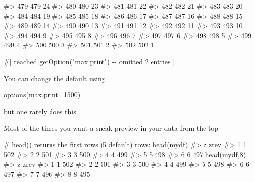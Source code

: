 \documentclass[
  letterpaper,
  DIV=11,
  numbers=noendperiod]{scrreprt}
\newenvironment{Shaded}{\begin{snugshade}}{\end{snugshade}}
\newcommand{\AttributeTok}[1]{\textcolor[rgb]{0.40,0.45,0.13}{#1}}
\newcommand{\CommentTok}[1]{\textcolor[rgb]{0.37,0.37,0.37}{#1}}
\newcommand{\DecValTok}[1]{\textcolor[rgb]{0.68,0.00,0.00}{#1}}
\newcommand{\FunctionTok}[1]{\textcolor[rgb]{0.28,0.35,0.67}{#1}}
\newcommand{\NormalTok}[1]{\textcolor[rgb]{0.00,0.23,0.31}{#1}}
\begin{document}
\begin{Shaded}
\begin{Highlighting}[]
\CommentTok{\#\textgreater{} 479 479   24}
\CommentTok{\#\textgreater{} 480 480   23}
\CommentTok{\#\textgreater{} 481 481   22}
\CommentTok{\#\textgreater{} 482 482   21}
\CommentTok{\#\textgreater{} 483 483   20}
\CommentTok{\#\textgreater{} 484 484   19}
\CommentTok{\#\textgreater{} 485 485   18}
\CommentTok{\#\textgreater{} 486 486   17}
\CommentTok{\#\textgreater{} 487 487   16}
\CommentTok{\#\textgreater{} 488 488   15}
\CommentTok{\#\textgreater{} 489 489   14}
\CommentTok{\#\textgreater{} 490 490   13}
\CommentTok{\#\textgreater{} 491 491   12}
\CommentTok{\#\textgreater{} 492 492   11}
\CommentTok{\#\textgreater{} 493 493   10}
\CommentTok{\#\textgreater{} 494 494    9}
\CommentTok{\#\textgreater{} 495 495    8}
\CommentTok{\#\textgreater{} 496 496    7}
\CommentTok{\#\textgreater{} 497 497    6}
\CommentTok{\#\textgreater{} 498 498    5}
\CommentTok{\#\textgreater{} 499 499    4}
\CommentTok{\#\textgreater{} 500 500    3}
\CommentTok{\#\textgreater{} 501 501    2}
\CommentTok{\#\textgreater{} 502 502    1}
\end{Highlighting}
\end{Shaded}

\begin{Shaded}
\begin{Highlighting}[]
\CommentTok{\#[ reached getOption("max.print") {-}{-} omitted 2 entries ]}
\end{Highlighting}
\end{Shaded}

You can change the default using

\begin{Shaded}
\begin{Highlighting}[]
 \FunctionTok{options}\NormalTok{(}\AttributeTok{max.print=}\DecValTok{1500}\NormalTok{)}
\end{Highlighting}
\end{Shaded}

but one rarely does this

Most of the times you want a sneak preview in your data from the top

\begin{Shaded}
\begin{Highlighting}[]
\CommentTok{\# head() returns the first rows (5 default) rows:}
\FunctionTok{head}\NormalTok{(mydf)}
\CommentTok{\#\textgreater{}   z zrev}
\CommentTok{\#\textgreater{} 1 1  502}
\CommentTok{\#\textgreater{} 2 2  501}
\CommentTok{\#\textgreater{} 3 3  500}
\CommentTok{\#\textgreater{} 4 4  499}
\CommentTok{\#\textgreater{} 5 5  498}
\CommentTok{\#\textgreater{} 6 6  497}
\FunctionTok{head}\NormalTok{(mydf,}\DecValTok{8}\NormalTok{)}
\CommentTok{\#\textgreater{}   z zrev}
\CommentTok{\#\textgreater{} 1 1  502}
\CommentTok{\#\textgreater{} 2 2  501}
\CommentTok{\#\textgreater{} 3 3  500}
\CommentTok{\#\textgreater{} 4 4  499}
\CommentTok{\#\textgreater{} 5 5  498}
\CommentTok{\#\textgreater{} 6 6  497}
\CommentTok{\#\textgreater{} 7 7  496}
\CommentTok{\#\textgreater{} 8 8  495}
\end{Highlighting}
\end{Shaded}
\end{document}
